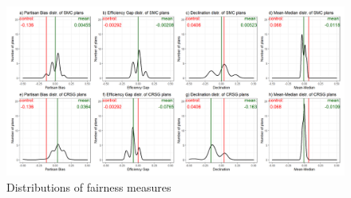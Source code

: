
\begin{landscape}
    \begin{figure}
     \centering
     \includegraphics{img/fair.density.png}
     \caption{Distributions of fairness measures}
     \label{fig:fair.density}
    \end{figure}
   \end{landscape}

